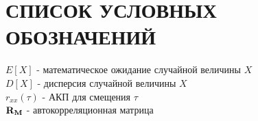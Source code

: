\section*{СПИСОК УСЛОВНЫХ ОБОЗНАЧЕНИЙ}
${E[X]}$ - математическое ожидание случайной величины $X$	\\
${D[X]}$ - дисперсия случайной величины $X$			\\
${r_{xx}(\tau)}$ - АКП для смещения ${\tau}$			\\
${\bf{R_M}}$ - автокорреляционная матрица			\\
\newpage
